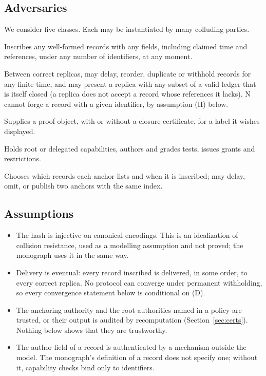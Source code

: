\documentclass[11pt]{article}
\theoremstyle{plain}
\theoremstyle{definition}
\theoremstyle{remark}
\begin{document}
\subsection{Adversaries}

We consider five classes. Each may be instantiated by many colluding parties.

\begin{description}[nosep,leftmargin=1.5em]
\item[C, contributor.] Inscribes any well-formed records with any fields, including claimed time and references, under any number of identifiers, at any moment.
\item[N, network or relay.] Between correct replicas, may delay, reorder, duplicate or withhold records for any finite time, and may present a replica with any subset of a valid ledger that is itself closed (a replica does not accept a record whose references it lacks). N cannot forge a record with a given identifier, by assumption (H) below.
\item[P, producer of justifications.] Supplies a proof object, with or without a closure certificate, for a label it wishes displayed.
\item[M, operator of gates.] Holds root or delegated capabilities, authors and grades tests, issues grants and restrictions.
\item[X, anchoring authority.] Chooses which records each anchor lists and when it is inscribed; may delay, omit, or publish two anchors with the same index.
\end{description}

\subsection{Assumptions}

\begin{itemize}[nosep]
\item[(H)] The hash is injective on canonical encodings. This is an idealization of collision resistance, used as a modelling assumption and not proved; the monograph uses it in the same way.
\item[(D)] Delivery is eventual: every record inscribed is delivered, in some order, to every correct replica. No protocol can converge under permanent withholding, so every convergence statement below is conditional on (D).
\item[(T)] The anchoring authority and the root authorities named in a policy are trusted, or their output is audited by recomputation (Section~\ref{sec:certs}). Nothing below shows that they are trustworthy.
\item[(A)] The author field of a record is authenticated by a mechanism outside the model. The monograph's definition of a record does not specify one; without it, capability checks bind only to identifiers.
\end{itemize}
\end{document}
